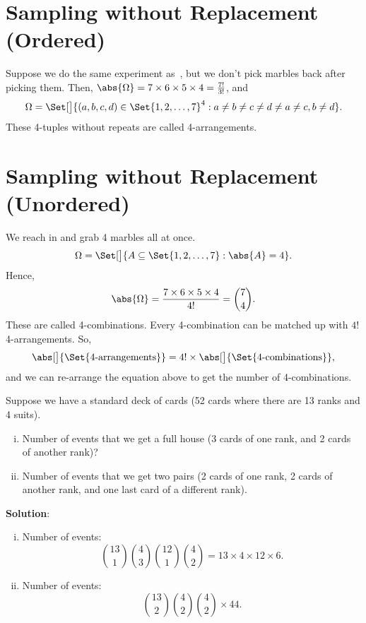 \section*{Sampling without Replacement (Ordered)}
\begin{Example}{}{}
    Suppose we do the same experiment as~,
    but we don't pick marbles back after picking them.
    Then, $ \abs{\Omega}=7\times 6\times 5\times 4=\frac{7!}{3!} $, and
    \[ \Omega=\Set[\big]{(a,b,c,d)\in\Set{1,2,\ldots,7}^4\given
            a\ne b\ne c\ne d\ne a\ne c,b\ne d}. \]
    These 4-tuples without repeats are called 4-arrangements.
\end{Example}
\section*{Sampling without Replacement (Unordered)}
\begin{Example}{}{}
    We reach in and grab 4 marbles all at once.
    \[ \Omega=\Set[\big]{A\subseteq \Set{1,2,\ldots,7}\given \abs{A}=4}. \]
    Hence,
    \[ \abs{\Omega}=\frac{7\times 6\times 5\times 4}{4!}=\binom{7}{4}. \]
    These are called 4-combinations. Every 4-combination can be matched up
    with $ 4! $ 4-arrangements. So,
    \[ \abs[\big]{\Set{\text{4-arrangements}}}=4!\times \abs[\big]{\Set{\text{4-combinations}}}, \]
    and we can re-arrange the equation above to get the number of 4-combinations.
\end{Example}
\begin{Example}{}{}
    Suppose we have a standard deck of cards (52 cards where there
    are 13 ranks and 4 suits).
    \begin{enumerate}[i.]
        \item Number of events that we get a full house (3 cards of
              one rank, and 2 cards of another rank)?
        \item Number of events that we get two pairs (2 cards of one rank,
              2 cards of another rank, and one last card of a different rank).
    \end{enumerate}
    \tcblower{}
    \textbf{Solution}:
    \begin{enumerate}[i.]
        \item Number of events:
              \[ \binom{13}{1}\binom{4}{3}\binom{12}{1}\binom{4}{2}=13\times 4\times 12\times 6. \]
        \item Number of events:
              \[ \binom{13}{2}\binom{4}{2}\binom{4}{2}\times 44. \]
    \end{enumerate}
\end{Example}
